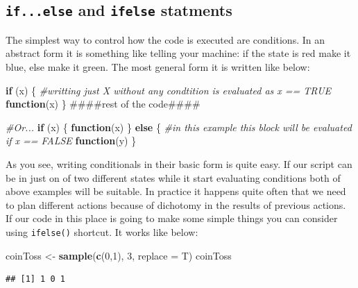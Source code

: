 \documentclass[]{book}
\newenvironment{Shaded}{\begin{snugshade}}{\end{snugshade}}
\newcommand{\KeywordTok}[1]{\textcolor[rgb]{0.13,0.29,0.53}{\textbf{#1}}}
\newcommand{\DataTypeTok}[1]{\textcolor[rgb]{0.13,0.29,0.53}{#1}}
\newcommand{\DecValTok}[1]{\textcolor[rgb]{0.00,0.00,0.81}{#1}}
\newcommand{\StringTok}[1]{\textcolor[rgb]{0.31,0.60,0.02}{#1}}
\newcommand{\CommentTok}[1]{\textcolor[rgb]{0.56,0.35,0.01}{\textit{#1}}}
\newcommand{\ControlFlowTok}[1]{\textcolor[rgb]{0.13,0.29,0.53}{\textbf{#1}}}
\newcommand{\NormalTok}[1]{#1}
\theoremstyle{definition}
\theoremstyle{definition}
\theoremstyle{definition}
\theoremstyle{remark}
\begin{document}
\subsection{\texorpdfstring{\texttt{if...else} and \texttt{ifelse}
statments}{if...else and ifelse statments}}\label{if...else-and-ifelse-statments}

The simplest way to control how the code is executed are conditions. In
an abstract form it is something like telling your machine: if the state
is red make it blue, else make it green. The most general form it is
written like below:

\begin{Shaded}
\begin{Highlighting}[]
\ControlFlowTok{if}\NormalTok{ (x) \{ }\CommentTok{#writting just X without any condtition is evaluated as x == TRUE}
  \ControlFlowTok{function}\NormalTok{(x)}
\NormalTok{\}}
\NormalTok{####rest of the code####}

\CommentTok{#Or...}
\ControlFlowTok{if}\NormalTok{ (x) \{}
  \ControlFlowTok{function}\NormalTok{(x)}
\NormalTok{\} }\ControlFlowTok{else}\NormalTok{ \{ }\CommentTok{#in this example this block will be evaluated if x == FALSE}
  \ControlFlowTok{function}\NormalTok{(y)}
\NormalTok{\}}
\end{Highlighting}
\end{Shaded}

As you see, writing conditionals in their basic form is quite easy. If
our script can be in just on of two different states while it start
evaluating conditions both of above examples will be suitable. In
practice it happens quite often that we need to plan different actions
because of dichotomy in the results of previous actions. If our code in
this place is going to make some simple things you can consider using
\texttt{ifelse()} shortcut. It works like below:

\begin{Shaded}
\begin{Highlighting}[]
\NormalTok{coinToss <-}\StringTok{ }\KeywordTok{sample}\NormalTok{(}\KeywordTok{c}\NormalTok{(}\DecValTok{0}\NormalTok{,}\DecValTok{1}\NormalTok{), }\DecValTok{3}\NormalTok{, }\DataTypeTok{replace =}\NormalTok{ T)}
\NormalTok{coinToss}
\end{Highlighting}
\end{Shaded}

\begin{verbatim}
## [1] 1 0 1
\end{verbatim}
\end{document}
